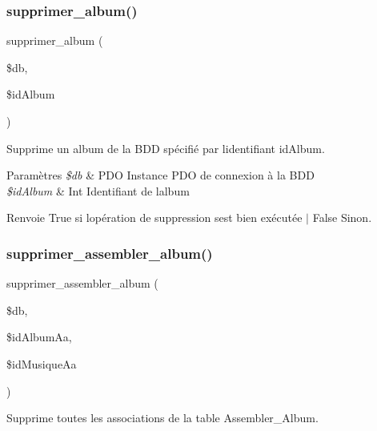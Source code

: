 \subsubsection{\texorpdfstring{supprimer\+\_\+album()}{supprimer\_album()}}
{\footnotesize\ttfamily supprimer\+\_\+album (\begin{DoxyParamCaption}\item[{}]{\$db,  }\item[{}]{\$id\+Album }\end{DoxyParamCaption})}



Supprime un album de la B\+DD spécifié par l\textquotesingle{}identifiant \textquotesingle{}id\+Album\textquotesingle{}. 


\begin{DoxyParams}{Paramètres}
{\em \$db} & P\+DO Instance P\+DO de connexion à la B\+DD \\
\hline
{\em \$id\+Album} & Int Identifiant de l\textquotesingle{}album \\
\hline
\end{DoxyParams}
\begin{DoxyReturn}{Renvoie}
True si l\textquotesingle{}opération de suppression s\textquotesingle{}est bien exécutée $\vert$ False Sinon. 
\end{DoxyReturn}
\mbox{\label{fonctionAlbum_8php_ae7db5b38c839b3fb5d22547e3bf7b085}} 
\subsubsection{\texorpdfstring{supprimer\+\_\+assembler\+\_\+album()}{supprimer\_assembler\_album()}}
{\footnotesize\ttfamily supprimer\+\_\+assembler\+\_\+album (\begin{DoxyParamCaption}\item[{}]{\$db,  }\item[{}]{\$id\+Album\+Aa,  }\item[{}]{\$id\+Musique\+Aa }\end{DoxyParamCaption})}



Supprime toutes les associations de la table Assembler\+\_\+\+Album. 


